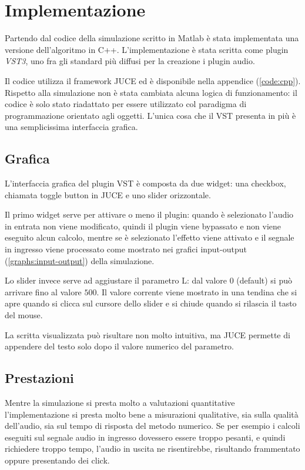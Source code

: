 \chapter{Implementazione}
	Partendo dal codice della simulazione scritto in Matlab è stata implementata una versione dell'algoritmo in C++. L'implementazione è stata scritta come plugin \textit{VST3}, uno fra gli standard più diffusi per la creazione i plugin audio.
	
	Il codice utilizza il framework JUCE ed è disponibile nella appendice (\ref{code:cpp}). Rispetto alla simulazione non è stata cambiata alcuna logica di funzionamento: il codice è solo stato riadattato per essere utilizzato col paradigma di programmazione orientato agli oggetti. L'unica cosa che il VST presenta in più è una semplicissima interfaccia grafica.
	\pagebreak
	
	\section{Grafica}
		L'interfaccia grafica del plugin VST è composta da due widget: una checkbox, chiamata toggle button in JUCE e uno slider orizzontale.
		
		
		Il primo widget serve per attivare o meno il plugin: quando è selezionato l'audio in entrata non viene modificato, quindi il plugin viene bypassato e non viene eseguito alcun calcolo, mentre se è selezionato l'effetto viene attivato e il segnale in ingresso viene processato come mostrato nei grafici input-output (\ref{graphs:input-output}) della simulazione.
		
		
		Lo slider invece serve ad aggiustare il parametro L: dal valore $0$ (default) si può arrivare fino al valore $500$. Il valore corrente viene mostrato in una tendina che si apre quando si clicca sul cursore dello slider e si chiude quando si rilascia il tasto del mouse.
		
		La scritta visualizzata può risultare non molto intuitiva, ma JUCE permette di appendere del testo solo dopo il valore numerico del parametro.
	
	\section{Prestazioni}
		Mentre la simulazione si presta molto a valutazioni quantitative l'implementazione si presta molto bene a misurazioni qualitative, sia sulla qualità dell'audio, sia sul tempo di risposta del metodo numerico. Se per esempio i calcoli eseguiti sul segnale audio in ingresso dovessero essere troppo pesanti, e quindi richiedere troppo tempo, l'audio in uscita ne risentirebbe, risultando frammentato oppure presentando dei click.
		
